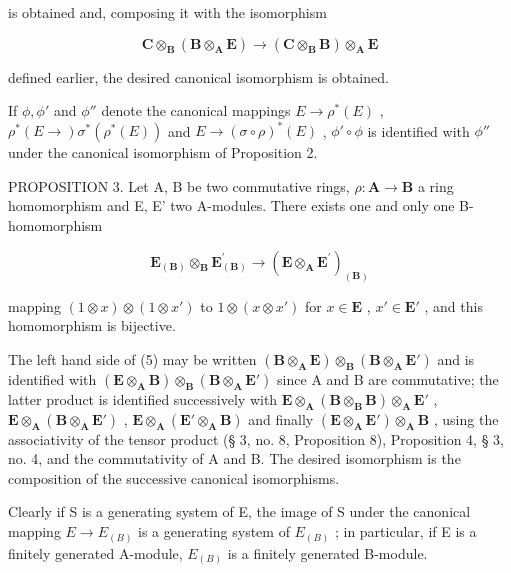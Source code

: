 is obtained and, composing it with the isomorphism

\[
\mathbf {C} \otimes_ {\mathbf {B}} (\mathbf {B} \otimes_ {\mathbf {A}} \mathbf {E}) \rightarrow (\mathbf {C} \otimes_ {\mathbf {B}} \mathbf {B}) \otimes_ {\mathbf {A}} \mathbf {E}
\]

defined earlier, the desired canonical isomorphism is obtained.

If \(\phi, \phi'\) and \(\phi''\) denote the canonical mappings \(E \to \rho^*(E)\) , \(\rho^*(E \to) \sigma^*(\rho^*(E))\) and \(E \to (\sigma \circ \rho)^*(E)\) , \(\phi' \circ \phi\) is identified with \(\phi''\) under the canonical isomorphism of Proposition 2.

PROPOSITION 3. Let A, B be two commutative rings, \(\rho: \mathbf{A} \to \mathbf{B}\) a ring homomorphism and E, E' two A-modules. There exists one and only one B-homomorphism

\[
\mathbf {E} _ {(\mathbf {B})} \otimes_ {\mathbf {B}} \mathbf {E} _ {(\mathbf {B})} ^ {\prime} \rightarrow (\mathbf {E} \otimes_ {\mathbf {A}} \mathbf {E} ^ {\prime}) _ {(\mathbf {B})}\tag{5}
\]

mapping \((1 \otimes x) \otimes (1 \otimes x')\) to \(1 \otimes (x \otimes x')\) for \(x \in \mathbf{E}\) , \(x' \in \mathbf{E}'\) , and this homomorphism is bijective.

The left hand side of (5) may be written \((\mathbf{B} \otimes_{\mathbf{A}} \mathbf{E}) \otimes_{\mathbf{B}} (\mathbf{B} \otimes_{\mathbf{A}} \mathbf{E}')\) and is identified with \((\mathbf{E} \otimes_{\mathbf{A}} \mathbf{B}) \otimes_{\mathbf{B}} (\mathbf{B} \otimes_{\mathbf{A}} \mathbf{E}')\) since A and B are commutative; the latter product is identified successively with \(\mathbf{E} \otimes_{\mathbf{A}} (\mathbf{B} \otimes_{\mathbf{B}} \mathbf{B}) \otimes_{\mathbf{A}} \mathbf{E}'\) , \(\mathbf{E} \otimes_{\mathbf{A}} (\mathbf{B} \otimes_{\mathbf{A}} \mathbf{E}')\) , \(\mathbf{E} \otimes_{\mathbf{A}} (\mathbf{E}' \otimes_{\mathbf{A}} \mathbf{B})\) and finally \((\mathbf{E} \otimes_{\mathbf{A}} \mathbf{E}') \otimes_{\mathbf{A}} \mathbf{B}\) , using the associativity of the tensor product (§ 3, no. 8, Proposition 8), Proposition 4, § 3, no. 4, and the commutativity of A and B. The desired isomorphism is the composition of the successive canonical isomorphisms.

Clearly if S is a generating system of E, the image of S under the canonical mapping \(E \rightarrow E_{(B)}\) is a generating system of \(E_{(B)}\) ; in particular, if E is a finitely generated A-module, \(E_{(B)}\) is a finitely generated B-module.

